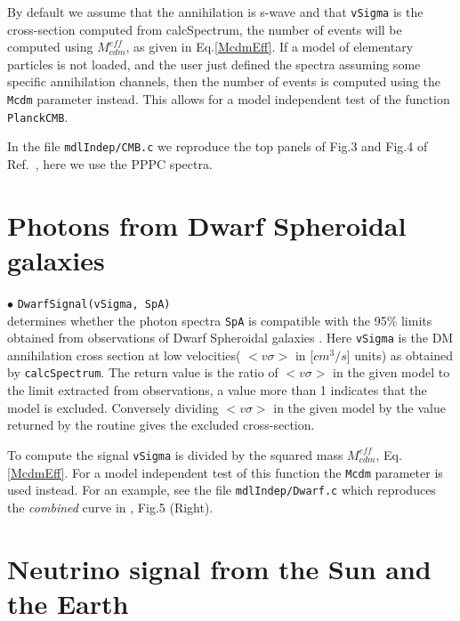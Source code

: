 \documentclass[12pt,a4paper]{article}
\begin{document}
By default we assume that the annihilation is s-wave and that  {\tt vSigma} is the cross-section computed from calcSpectrum, the number of events will be computed using  $M_{cdm}^{eff}$, as given in  Eq.\ref{McdmEff}.
  If  a model of elementary particles is not loaded,  and the user just defined the spectra assuming some specific annihilation channels, then the number of events is computed using the {\tt Mcdm} parameter instead.  This  allows for a  model independent  test of the  function  {\tt PlanckCMB}. 
 
In the file {\tt mdlIndep/CMB.c} we reproduce the top panels of Fig.3 and Fig.4 of Ref.~\cite{Slatyer_2016}, here we use the PPPC spectra.


\section{ Photons from Dwarf Spheroidal galaxies}

\noindent
$\bullet$ \verb|DwarfSignal(vSigma, SpA)|\\
determines whether the photon spectra {\tt SpA}  is compatible with the 95\% limits obtained from observations of Dwarf Spheroidal galaxies \cite{Albert_2017, Bonnivard_2015, Alvarez_2020}. Here {\tt vSigma} is the  DM annihilation cross section at low velocities( $<v\sigma>$  in [$cm^3/s$] units)  as obtained by \verb|calcSpectrum|.  
The return value is the ratio of $<v\sigma>$ in the given model to the limit extracted from observations, a  value  more than 1 indicates that the model is excluded.
Conversely dividing   $<v\sigma>$ in the given model by the value returned by the routine gives the excluded cross-section.

To compute  the signal {\tt vSigma} is  divided by the  squared mass $M_{cdm}^{eff}$, Eq.\ref{McdmEff}. For a model independent test of this function
the {\tt Mcdm} parameter is used instead. For an example,  see the file {\tt mdlIndep/Dwarf.c}  which reproduces  the  {\it combined} curve  in \cite{Alvarez_2020},  Fig.5 (Right). 


\section{Neutrino signal from the Sun and the Earth }
\label{sec:neutrino}
\end{document}
